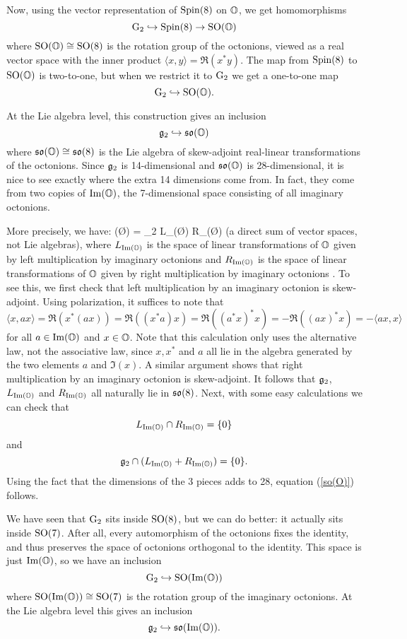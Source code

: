 Now, using the vector representation of ${\rm Spin}(8)$ on ${\mathbb O}$, we    
get homomorphisms   
\[       {\rm G}_2 \hookrightarrow {\rm Spin}(8) \to {\rm SO}({\mathbb O})  \]   
where ${\rm SO}({\mathbb O}) \cong {\rm SO}(8)$ is the rotation group of the octonions,   
viewed as a real vector space with the inner product $\langle x,y\rangle   
= \Re(x^\ast y)$.   The map from ${\rm Spin}(8)$ to ${\rm SO}({\mathbb O})$ is two-to-one,   
but when we restrict it to ${\rm G}_2$ we get a one-to-one map   
\[       {\rm G}_2 \hookrightarrow {\rm SO}({\mathbb O}) . \]   
   
At the Lie algebra level, this construction gives an inclusion   
\[      {\mathfrak {g}}_2 \hookrightarrow {\mathfrak {so}}({\mathbb O})  \]   
where ${\mathfrak {so}}({\mathbb O}) \cong {\mathfrak {so}}(8)$ is the Lie algebra of skew-adjoint   
real-linear transformations of the octonions.   Since ${\mathfrak {g}}_2$ is   
14-dimensional and ${\mathfrak {so}}({\mathbb O})$ is 28-dimensional, it is nice to see   
exactly where the extra 14 dimensions come from.  In fact, they come   
from two copies of ${\rm Im}({\mathbb O})$, the 7-dimensional space consisting of all   
imaginary octonions.     
   
More precisely, we have:   
\be  \so(\O) = \g_2 \oplus L_{\Im(\O)} \oplus R_{\Im(\O)} \label{so(O)} \ee   
(a direct sum of vector spaces, not Lie algebras), where $L_{{\rm Im}({\mathbb O})}$    
is the space of linear transformations of ${\mathbb O}$ given by left multiplication   
by imaginary octonions and $R_{{\rm Im}({\mathbb O})}$ is the space of linear   
transformations of ${\mathbb O}$ given by right multiplication by imaginary   
octonions \cite{Schafer}.   To see this, we first check that left   
multiplication by an imaginary octonion is skew-adjoint.  Using   
polarization, it suffices to note that   
\[           \langle x,ax \rangle = \Re(x^*(ax)) = \Re((x^*a)x) =   
\Re((a^*x)^*x) = -\Re((ax)^* x) = -\langle ax,x \rangle \]   
for all $a \in {\rm Im}({\mathbb O})$ and $x \in {\mathbb O}$.  Note that this calculation only   
uses the alternative law, not the associative law, since $x, x^\ast$   
and $a$ all lie in the algebra generated by the two elements $a$ and    
$\Im(x)$.  A similar argument shows that right multiplication by   
an imaginary octonion is skew-adjoint.  It follows that    
${\mathfrak {g}}_2$, $L_{{\rm Im}({\mathbb O})}$ and $R_{{\rm Im}({\mathbb O})}$ all naturally lie in ${\mathfrak {so}}(8)$.  
Next, with some easy calculations we can check that 
\[     L_{{\rm Im}({\mathbb O})} \cap R_{{\rm Im}({\mathbb O})} = \{0\} \]
and 
\[    {\mathfrak {g}}_2 \cap (L_{{\rm Im}({\mathbb O})} + R_{{\rm Im}({\mathbb O})}) = \{0\} .\]
Using the fact that the dimensions of the 3 pieces adds to 28,
equation (\ref{so(O)}) follows.
   
We have seen that ${\rm G}_2$ sits inside ${\rm SO}(8)$, but we can do better: it   
actually sits inside ${\rm SO}(7)$.  After all, every automorphism of the   
octonions fixes the identity, and thus preserves the space of octonions   
orthogonal to the identity.  This space is just ${\rm Im}({\mathbb O})$, so   
we have an inclusion   
\[       {\rm G}_2 \hookrightarrow {\rm SO}({\rm Im}({\mathbb O}))  \]   
where ${\rm SO}({\rm Im}({\mathbb O})) \cong {\rm SO}(7)$ is the rotation group of the imaginary   
octonions.  At the Lie algebra level this gives an inclusion   
\[        {\mathfrak {g}}_2 \hookrightarrow {\mathfrak {so}}({\rm Im}({\mathbb O}))  . \]   
   
